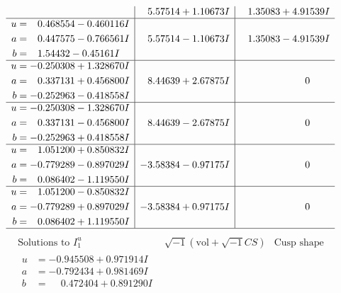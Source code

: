 \documentclass[1p]{elsarticle_modified}
\theoremstyle{definition}
\newcommand{\I}{\sqrt{-1}}
\begin{document}
$$\begin{array}{c|c|c}
 & \phantom{-}5.57514 + 1.10673 I & \phantom{-}1.35083 + 4.91539 I \\ \hline\begin{aligned}
u &= \phantom{-}0.468554 - 0.460116 I \\
a &= \phantom{-}0.447575 - 0.766561 I \\
b &= \phantom{-}1.54432 - 0.45161 I\end{aligned}
 & \phantom{-}5.57514 - 1.10673 I & \phantom{-}1.35083 - 4.91539 I \\ \hline\begin{aligned}
u &= -0.250308 + 1.328670 I \\
a &= \phantom{-}0.337131 + 0.456800 I \\
b &= -0.252963 - 0.418558 I\end{aligned}
 & \phantom{-}8.44639 + 2.67875 I & \phantom{-0.000000 } 0 \\ \hline\begin{aligned}
u &= -0.250308 - 1.328670 I \\
a &= \phantom{-}0.337131 - 0.456800 I \\
b &= -0.252963 + 0.418558 I\end{aligned}
 & \phantom{-}8.44639 - 2.67875 I & \phantom{-0.000000 } 0 \\ \hline\begin{aligned}
u &= \phantom{-}1.051200 + 0.850832 I \\
a &= -0.779289 - 0.897029 I \\
b &= \phantom{-}0.086402 - 1.119550 I\end{aligned}
 & -3.58384 - 0.97175 I & \phantom{-0.000000 } 0 \\ \hline\begin{aligned}
u &= \phantom{-}1.051200 - 0.850832 I \\
a &= -0.779289 + 0.897029 I \\
b &= \phantom{-}0.086402 + 1.119550 I\end{aligned}
 & -3.58384 + 0.97175 I & \phantom{-0.000000 } 0\\
 \hline 
 \end{array}$$\newpage$$\begin{array}{c|c|c}  
\text{Solutions to }I^u_{1}& \I (\text{vol} + \sqrt{-1}CS) & \text{Cusp shape}\\
 \hline 
\begin{aligned}
u &= -0.945508 + 0.971914 I \\
a &= -0.792434 + 0.981469 I \\
b &= \phantom{-}0.472404 + 0.891290 I\end{aligned}

\end{array}$$
\end{document}
